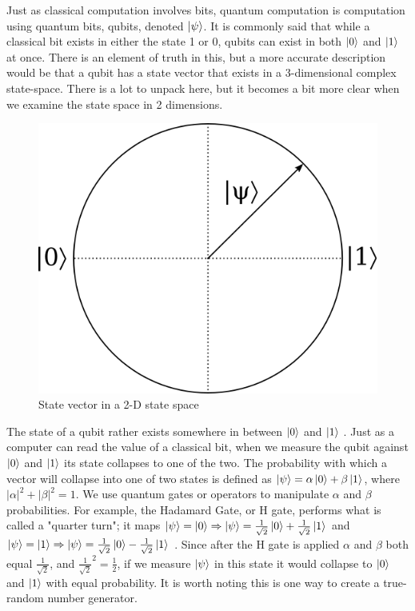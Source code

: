 Just as classical computation involves bits, quantum computation is computation using quantum bits, qubits, denoted $\ket{\psi}$. 
It is commonly said that while a classical bit exists in either the state 1 or 0, qubits can exist in both  $\ket{0}$ and $\ket{1}$ at once.
There is an element of truth in this, but a more accurate description would be that a qubit has a state vector that exists in a 3-dimensional complex state-space. 
There is a lot to unpack here, but it becomes a bit more clear when we examine the state space in 2 dimensions.
\begin{figure}[htp]
\centering
\includegraphics[scale=.25]{images/standard_basis.png}
\caption{State vector in a 2-D state space}
\label{Standard basis circle}
\end{figure}
The state of a qubit rather exists somewhere in between $\ket{0}$ and $\ket{1}$ \cite{qc:agi}.
Just as a computer can read the value of a classical bit, when we measure the qubit against $\ket{0}$ and $\ket{1}$ its state collapses to one of the two.
The probability with which a vector will collapse into one of two states is defined as $\ket{\psi} = \alpha\ket{0} + \beta\ket{1}$, where $|\alpha|^2 + |\beta|^2 = 1$.
We use quantum gates or operators to manipulate $\alpha$ and $\beta$ probabilities.
For example, the Hadamard Gate, or H gate, performs what is called a "quarter turn"; it maps $\ket{\psi} = \ket{0} \Rightarrow \ket{\psi} = \frac{1}{\sqrt{2}}\ket{0} + \frac{1}{\sqrt{2}}\ket{1}$ and $\ket{\psi} = \ket{1} \Rightarrow \ket{\psi} = \frac{1}{\sqrt{2}}\ket{0} - \frac{1}{\sqrt{2}}\ket{1}$ \cite{qc:agi}.
Since after the H gate is applied $\alpha$ and $\beta$ both equal $\frac{1}{\sqrt{2}}$, and ${\frac{1}{\sqrt{2}}}^2 = \frac{1}{2}$, if we measure $\ket{\psi}$ in this state it would collapse to $\ket{0}$ and $\ket{1}$ with equal probability. 
It is worth noting this is one way to create a true-random number generator.

